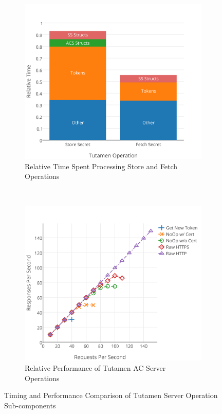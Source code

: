 \begin{figure}[thb]
  \centering
  \begin{subfigure}[t]{0.48\textwidth}
    \includegraphics[width=\textwidth]{./figs/png/timing_bars_chart.png}
    \caption{Relative Time Spent Processing Store and Fetch
      Operations}
    \label{fig:eval:rel:secret}
  \end{subfigure}
  ~
  \begin{subfigure}[t]{0.48\textwidth}
    \includegraphics[width=\textwidth]{./figs/png/get_ac_auth_breakdown_chart.png}
    \caption{Relative Performance of Tutamen AC Server Operations}
    \label{fig:eval:rel:acops}
  \end{subfigure}
  \caption{Timing and Performance Comparison of Tutamen Server
    Operation Sub-components}
  \label{fig:eval:rel}
\end{figure}

